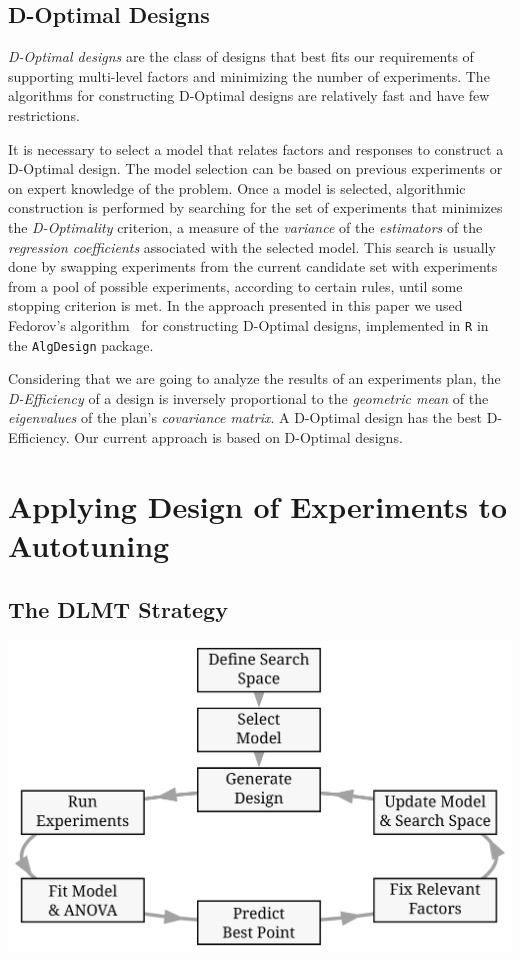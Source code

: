 \documentclass[conference]{IEEEtran}
\begin{document}
\subsection{D-Optimal Designs}
\label{sec:orgfc8693c}
\emph{D-Optimal designs} are the class of designs that best fits our requirements of
supporting multi-level factors and minimizing the number of experiments. The
algorithms for constructing D-Optimal designs are relatively fast and have few
restrictions.

It is necessary to select a model that relates factors and responses to
construct a D-Optimal design. The model selection can be based on previous
experiments or on expert knowledge of the problem. Once a model is selected,
algorithmic construction is performed by searching for the set of experiments
that minimizes the \emph{D-Optimality} criterion, a measure of the \emph{variance} of the
\emph{estimators} of the \emph{regression coefficients} associated with the selected
model. This search is usually done by swapping experiments from the current
candidate set with experiments from a pool of possible experiments, according to
certain rules, until some stopping criterion is met. In the approach presented
in this paper we used Fedorov's algorithm~\cite{fedorov1972theory} for
constructing D-Optimal designs, implemented in \texttt{R} in the \texttt{AlgDesign} package.

Considering that we are going to analyze the results of an experiments plan, the
\emph{D-Efficiency} of a design is inversely proportional to the \emph{geometric mean} of
the \emph{eigenvalues} of the plan's \emph{covariance matrix}. A D-Optimal design has the
best D-Efficiency. Our current approach is based on D-Optimal designs.
\section{Applying Design of Experiments to Autotuning}
\label{sec:org2cfbaf8}
\subsection{The DLMT Strategy}
\label{sec:orgc3d017e}
\begin{center}
\begin{center}
\includegraphics[width=.8\columnwidth]{./img/doe_anova_strategy.pdf}
\end{center}
\end{center}
\end{document}
